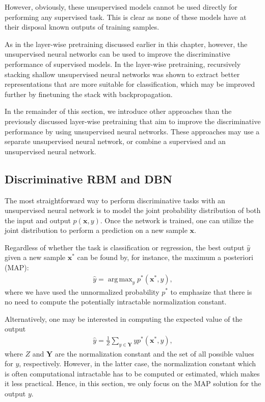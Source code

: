 \documentclass[dissertation,nocontribution,draft*]{aaltoseries}
\newcommand{\vect}[1]{\mathbf{#1}}
\newcommand{\matr}[1]{\mathbf{#1}}
\newcommand{\vx}[0]{\vect{x}}
\newcommand{\mY}[0]{\matr{Y}}
\DeclareMathOperator*{\argmax}{arg\,max}
\begin{document}
However, obviously, these unsupervised models cannot be used
directly for performing any supervised task.  This is
clear as none of these models have at their disposal known
outputs of training samples.

As in the layer-wise pretraining discussed earlier in this
chapter, however, the unsupervised neural networks can be
used to improve the discriminative performance of 
supervised models. In the layer-wise pretraining,
recursively stacking shallow unsupervised neural networks
was shown to extract better representations that are more
suitable for classification, which may be improved further by
finetuning the stack with backpropagation.

In the remainder of this section, we introduce other approaches
than the previously discussed layer-wise pretraining
that aim to improve the discriminative performance by
using unsupervised neural networks. These approaches
may use a separate unsupervised neural network, or combine a
supervised and an unsupervised neural network.

\subsection{Discriminative RBM and DBN}
\label{sec:drbm}

The most straightforward way to perform discriminative tasks
with an unsupervised neural network is to model the joint
probability distribution of both the input and output
$p(\vx, y)$. Once the network is trained, one can utilize
the joint distribution to perform a prediction on a new
sample $\vx$. 

Regardless of whether the task is classification or
regression, the best output $\hat{y}$ given a new sample
$\vx^*$ can be found by, for instance, the maximum a
posteriori (MAP):
\begin{align}
    \label{eq:gen_class}
    \hat{y} = \argmax_{y} p^*(\vx^*, y),
\end{align}
where we have used the unnormalized probability $p^*$ to
emphasize that there is no need to compute the potentially
intractable normalization constant. 

Alternatively, one may be interested in computing the
expected value of the output 
\begin{align}
    \label{eq:gen_class}
    \hat{y} = \frac{1}{Z} \sum_{y \in \mY} y p^*(\vx^*, y),
\end{align}
where $Z$ and $\mY$ are the normalization constant and the
set of all possible values for $y$, respectively. However, in the
latter case, the normalization constant which is often
computational intractable has to be computed or estimated,
which makes it less practical. Hence, in this section, we
only focus on the MAP solution for the output $y$.
\end{document}
